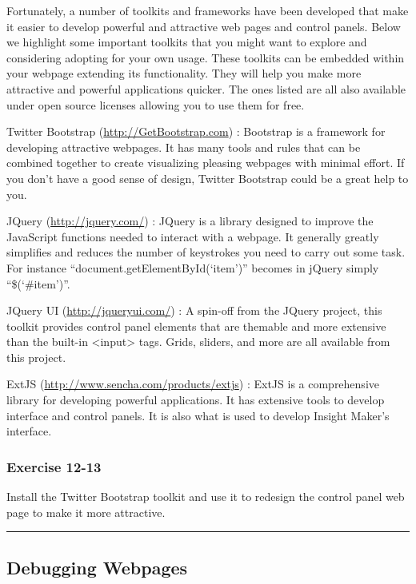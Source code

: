 \documentclass[]{memoir}
\begin{document}
Fortunately, a number of toolkits and frameworks have been developed
that make it easier to develop powerful and attractive web pages and
control panels. Below we highlight some important toolkits that you
might want to explore and considering adopting for your own usage. These
toolkits can be embedded within your webpage extending its
functionality. They will help you make more attractive and powerful
applications quicker. The ones listed are all also available under open
source licenses allowing you to use them for free.

Twitter Bootstrap (\url{http://GetBootstrap.com}) : Bootstrap is a
framework for developing attractive webpages. It has many tools and
rules that can be combined together to create visualizing pleasing
webpages with minimal effort. If you don't have a good sense of design,
Twitter Bootstrap could be a great help to you.

JQuery (\url{http://jquery.com/}) : JQuery is a library designed to
improve the JavaScript functions needed to interact with a webpage. It
generally greatly simplifies and reduces the number of keystrokes you
need to carry out some task. For instance
``document.getElementById(`item')'' becomes in jQuery simply
``\$(`\#item')''.

JQuery UI (\url{http://jqueryui.com/}) : A spin-off from the JQuery
project, this toolkit provides control panel elements that are themable
and more extensive than the built-in \textless{}input\textgreater{}
tags. Grids, sliders, and more are all available from this project.

ExtJS (\url{http://www.sencha.com/products/extjs}) : ExtJS is a
comprehensive library for developing powerful applications. It has
extensive tools to develop interface and control panels. It is also what
is used to develop Insight Maker's interface.

\subsubsection{Exercise 12-13}

Install the Twitter Bootstrap toolkit and use it to redesign the control
panel web page to make it more attractive.

\begin{center}\rule{3in}{0.4pt}\end{center}

\subsection{Debugging Webpages}
\end{document}
